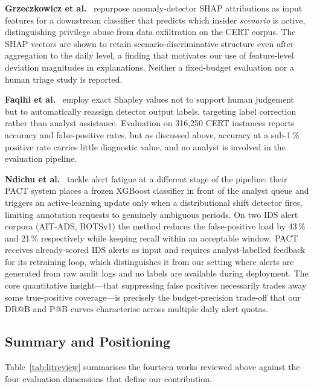 \textbf{Grzeczkowicz et al.}~\cite{grzeczkowicz2025xai} repurpose anomaly-detector SHAP
attributions as input features for a downstream classifier that predicts which insider \emph{scenario}
is active, distinguishing privilege abuse from data exfiltration on the CERT corpus.
The SHAP vectors are shown to retain scenario-discriminative structure even after aggregation
to the daily level, a finding that motivates our use of feature-level deviation magnitudes in
explanations. Neither a fixed-budget evaluation nor a human triage study is reported.

\textbf{Faqihi et al.}~\cite{faqihi2026shap} employ exact Shapley values not to support
human judgement but to automatically reassign detector output labels, targeting label correction
rather than analyst assistance.
Evaluation on 316{,}250 CERT instances reports accuracy and false-positive rates, but as
discussed above, accuracy at a sub-1\,\% positive rate carries little diagnostic value, and
no analyst is involved in the evaluation pipeline.

\textbf{Ndichu et al.}~\cite{ndichu2026pact} tackle alert fatigue at a different stage of the
pipeline: their PACT system places a frozen XGBoost classifier in front of the analyst queue
and triggers an active-learning update only when a distributional shift detector fires,
limiting annotation requests to genuinely ambiguous periods.
On two IDS alert corpora (AIT-ADS, BOTSv1) the method reduces the false-positive load by 43\,\%
and 21\,\% respectively while keeping recall within an acceptable window.
PACT receives already-scored IDS alerts as input and requires analyst-labelled feedback for
its retraining loop, which distinguishes it from our setting where alerts are generated from
raw audit logs and no labels are available during deployment.
The core quantitative insight---that suppressing false positives necessarily trades away some
true-positive coverage---is precisely the budget-precision trade-off that our DR@B and P@B
curves characterise across multiple daily alert quotas.

\subsection{Summary and Positioning}

Table~\ref{tab:litreview} summarises the fourteen works reviewed above against the four
evaluation dimensions that define our contribution.

